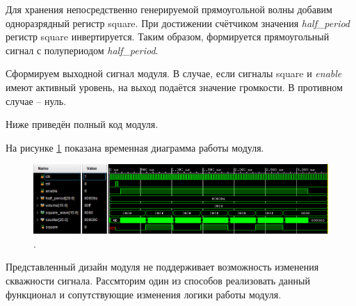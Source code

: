 \noindent
\begin{minipage}{\linewidth}
	
\end{minipage}

Для хранения непосредственно генерируемой прямоугольной волны добавим одноразрядный регистр square.
При достижении счётчиком значения \textit{half\_period} регистр square инвертируется. Таким образом, формируется прямоугольный сигнал с полупериодом \textit{half\_period}.

\noindent
\begin{minipage}{\linewidth}
	
\end{minipage}

Сформируем выходной сигнал модуля. В случае, если сигналы square и \textit{enable} имеют активный уровень, на выход подаётся значение громкости. В противном случае -- нуль.

\noindent
\begin{minipage}{\linewidth}
	
\end{minipage}

Ниже приведён полный код модуля.

\noindent
\begin{minipage}{\linewidth}
	
\end{minipage}


На рисунке \ref{lab7:pic5} показана временная диаграмма работы модуля.

\begin{figure}[H]
	\centering
	\includegraphics [width=1\textwidth] {images/lab_7/square_simulate.PNG}
	\caption{.}
	\label{lab7:pic5}
\end{figure}


Представленный дизайн модуля не поддерживает возможность изменения скважности сигнала. Рассмторим один из способов реализовать данный функционал и сопутствующие изменения логики работы модуля.

